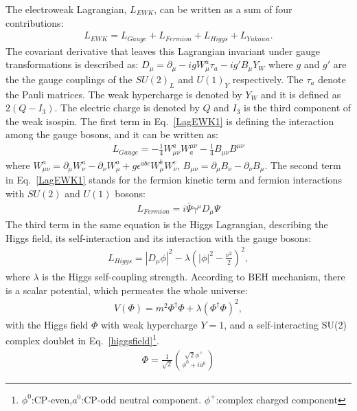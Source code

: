The electroweak Lagrangian, $L_{EWK}$, can be written as a sum of four contributions:
\begin{eqnarray}
\label{LagEWK1}
{L_{EWK} = L_{Gauge}+L_{Fermion}+L_{Higgs}+L_{Yukawa}}.
\end{eqnarray}
The covariant derivative that leaves this Lagrangian invariant under gauge transformations is described as: $D_{\mu}=\partial_{\mu}-igW_{\mu}^a\tau_a - ig'B_{\mu}Y_W$ where $g$ and $g'$ are the the gauge couplings of the $S U(2)_L$ and $U(1)_Y$ respectively. The $\tau_a$ denote the Pauli matrices. The weak hypercharge is denoted by $Y_W$ and it is defined as $2(Q-I_3)$. The electric charge is denoted by $Q$ and $I_3$ is the third component of the weak isospin.
The first term in Eq.~\ref{LagEWK1} is defining the interaction among the gauge bosons, and it can be written as:
\begin{eqnarray}
\label{Laggauge1}
{L_{Gauge} = -\frac{1}{4}W_{\mu\nu}^aW^{\mu\nu}_a -\frac{1}{4}B_{\mu\nu}B^{\mu\nu} }
\end{eqnarray}
where $W_{\mu\nu}^a = \partial_{\mu}W_{\nu}^a - \partial_{\nu}W_{\mu}^a + g\epsilon^{abc}W_{\mu}^bW_{\nu}^c$,
 $B_{\mu\nu} = \partial_{\mu}B_{\nu} - \partial_{\nu}B_{\mu}$.
The second term in Eq.~\ref{LagEWK1} stands for the fermion kinetic term and fermion interactions with $SU(2)$ and $U(1)$ bosons:
\begin{eqnarray}
\label{Lagfermions1}
{L_{Fermion} = i\bar{\Psi}\gamma^{\mu}D_{\mu}\Psi}
\end{eqnarray}
The third term in the same equation is the Higgs Lagrangian, describing the Higgs field, its self-interaction and its interaction with the gauge bosons:
\begin{eqnarray}
\label{LagHiggs1}
{L_{Higgs} = |D_{\mu}\phi|^2 - \lambda(|\phi|^2 - \frac{\nu^2}{2})^2},
\end{eqnarray}
where $\lambda$ is the Higgs self-coupling strength. %
According to BEH mechanism, there is a scalar potential, which permeates the whole universe: 
\begin{eqnarray}
\label{higgspot}
	{V(\Phi)}= {m^2\Phi^{\dagger}\Phi+\lambda(\Phi^{\dagger}\Phi)^2},
\end{eqnarray}
with the Higgs field $\Phi$ with weak hypercharge $Y =1$, and a self-interacting SU(2) complex doublet in Eq.~\ref{higgsfield}\footnote{$\phi^0$:CP-even,$a^0$:CP-odd neutral component. $\phi^+$:complex charged component}.
\begin{eqnarray}
\label{higgsfield}
	{\Phi}= {\frac{1}{\sqrt2}}{\sqrt2\phi^{+}  \choose \phi^0 + ia^0 }
\end{eqnarray}
